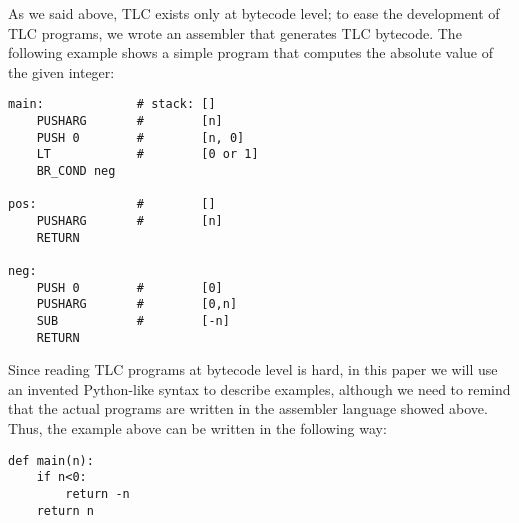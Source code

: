 As we said above, TLC exists only at bytecode level; to ease the development
of TLC programs, we wrote an assembler that generates TLC bytecode. The
following example shows a simple program that computes the absolute value of
the given integer:

\begin{lstlisting}
main:             # stack: []
    PUSHARG       #        [n]
    PUSH 0        #        [n, 0]
    LT            #        [0 or 1]
    BR_COND neg

pos:              #        []
    PUSHARG       #        [n]
    RETURN

neg:
    PUSH 0        #        [0]
    PUSHARG       #        [0,n]
    SUB           #        [-n]
    RETURN
\end{lstlisting}

Since reading TLC programs at bytecode level is hard, in this paper we will
use an invented Python-like syntax to describe examples, although we need to
remind that the actual programs are written in the assembler language showed
above. Thus, the example above can be written in the following way:

\begin{lstlisting}
def main(n):
    if n<0:
        return -n
    return n
\end{lstlisting}
